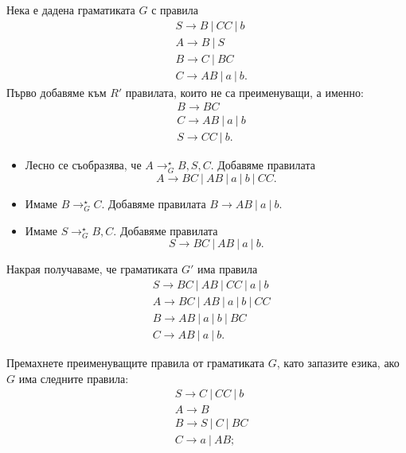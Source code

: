 {\scriptsize
  \begin{multicols}{2}
\begin{example}
  Нека е дадена граматиката $G$ с правила  
  \begin{align*}
    & S \to B\ |\ CC\ |\ b\\
    & A \to B\ |\ S\\
    & B \to C\ |\ BC\\
    & C \to AB\ |\ a\ |\ b.
  \end{align*}
  Първо добавяме към $R'$ правилата, които не са преименуващи, а именно:
  \begin{align*}
    & B \to BC\\
    & C \to AB\ |\ a\ |\ b\\
    & S \to CC\ |\ b.
  \end{align*}
  \begin{itemize}
  \item 
    Лесно се съобразява, че $A \to^\star_G B,S,C$.
    Добавяме правилата 
    \[A \to BC\ |\ AB\ |\ a\ |\ b\ |\ CC.\]
  \item
    Имаме $B \to^\star_G C$.
    Добавяме правилата $B \to AB\ |\ a\ |\ b$.
  \item
    Имаме $S \to^\star_G B,C$.
    Добавяме правилата
    \[S \to BC\ |\ AB\ |\ a\ |\ b.\]
  \end{itemize}
  Накрая получаваме, че граматиката $G'$ има правила
  \begin{align*}
    & S \to BC\ |\ AB\ |\ CC\ |\ a\ |\ b\\
    & A \to BC\ |\ AB\ |\ a\ |\ b\ |\ CC\\
    & B \to AB\ |\ a\ |\ b\ |\ BC\\
    & C \to AB\ |\ a\ |\ b.
  \end{align*}
\end{example}
\end{multicols}
}

\begin{problem}
  Премахнете преименуващите правила от граматиката $G$, като запазите езика, ако $G$ има следните правила:
    \begin{align*}
      & S \to C\ |\ CC\ |\ b\\
      & A \to B\\
      & B \to S\ |\ C\ |\ BC\\
      & C \to a\ |\ AB;
    \end{align*}
\end{problem}

